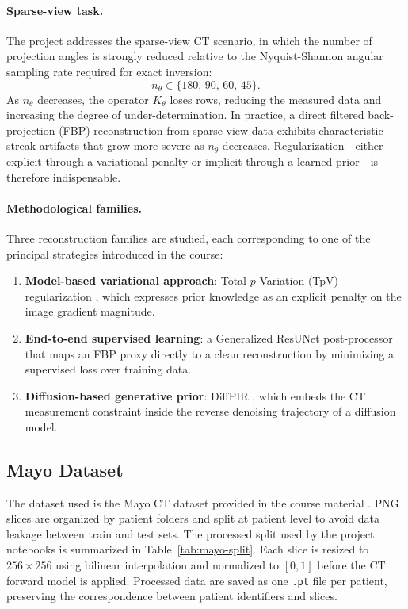 \documentclass[11pt,a4paper]{article}
\begin{document}
\paragraph{Sparse-view task.}
The project addresses the sparse-view CT scenario, in which the number of
projection angles is strongly reduced relative to the Nyquist-Shannon angular
sampling rate required for exact inversion:
\begin{equation}
  n_\theta \in \{180,\,90,\,60,\,45\}.
  \label{eq:view-settings}
\end{equation}
As $n_\theta$ decreases, the operator $K_\theta$ loses rows, reducing the
measured data and increasing the degree of under-determination. In practice, a
direct filtered back-projection (FBP) reconstruction from sparse-view data
exhibits characteristic streak artifacts that grow more severe as $n_\theta$
decreases. Regularization---either explicit through a variational penalty or
implicit through a learned prior---is therefore indispensable.

\paragraph{Methodological families.}
Three reconstruction families are studied, each corresponding to one of the
principal strategies introduced in the course:
\begin{enumerate}[leftmargin=*]
  \item \textbf{Model-based variational approach}: Total $p$-Variation (TpV)
        regularization \cite{rudin1992nonlinear}, which expresses prior
        knowledge as an explicit penalty on the image gradient magnitude.
  \item \textbf{End-to-end supervised learning}: a Generalized ResUNet
        post-processor \cite{ronneberger2015unet} that maps an FBP proxy
        directly to a clean reconstruction by minimizing a supervised loss over
        training data.
  \item \textbf{Diffusion-based generative prior}: DiffPIR
        \cite{zhu2023denoising}, which embeds the CT measurement constraint
        inside the reverse denoising trajectory of a diffusion model.
\end{enumerate}

\subsection*{Mayo Dataset}

The dataset used is the Mayo CT dataset provided in the course material
\cite{mccollough2016lowdose}. PNG slices are organized by patient folders and
split at patient level to avoid data leakage between train and test sets.
The processed split used by the project notebooks is summarized in
Table~\ref{tab:mayo-split}. Each slice is resized to $256\times256$ using
bilinear interpolation and normalized to $[0,1]$ before the CT forward model
is applied. Processed data are saved as one \texttt{.pt} file per patient,
preserving the correspondence between patient identifiers and slices.
\end{document}
